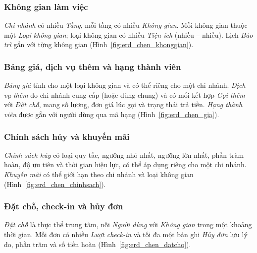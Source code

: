 \subsubsection{Không gian làm việc}
\emph{Chi nhánh} có nhiều \emph{Tầng}, mỗi tầng có nhiều \emph{Không gian}. Mỗi không gian thuộc một \emph{Loại không gian}; loại không gian có nhiều \emph{Tiện ích} (nhiều -- nhiều). Lịch \emph{Bảo trì} gắn với từng không gian (Hình~\ref{fig:erd_chen_khonggian}).


\subsubsection{Bảng giá, dịch vụ thêm và hạng thành viên}
\emph{Bảng giá} tính cho một loại không gian và có thể riêng cho một chi nhánh. \emph{Dịch vụ thêm} do chi nhánh cung cấp (hoặc dùng chung) và có mối kết hợp \emph{Gọi thêm} với \emph{Đặt chỗ}, mang số lượng, đơn giá lúc gọi và trạng thái trả tiền. \emph{Hạng thành viên} được gắn với người dùng qua mã hạng (Hình~\ref{fig:erd_chen_gia}).


\subsubsection{Chính sách hủy và khuyến mãi}
\emph{Chính sách hủy} có loại quy tắc, ngưỡng nhỏ nhất, ngưỡng lớn nhất, phần trăm hoàn, độ ưu tiên và thời gian hiệu lực, có thể áp dụng riêng cho một chi nhánh. \emph{Khuyến mãi} có thể giới hạn theo chi nhánh và loại không gian (Hình~\ref{fig:erd_chen_chinhsach}).


\subsubsection{Đặt chỗ, check-in và hủy đơn}
\emph{Đặt chỗ} là thực thể trung tâm, nối \emph{Người dùng} với \emph{Không gian} trong một khoảng thời gian. Mỗi đơn có nhiều \emph{Lượt check-in} và tối đa một bản ghi \emph{Hủy đơn} lưu lý do, phần trăm và số tiền hoàn (Hình~\ref{fig:erd_chen_datcho}).


